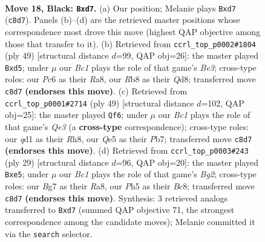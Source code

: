 \documentclass[11pt]{article}
\begin{document}
\clearpage

\begin{figure}[p]\centering
\begin{subfigure}{0.46\textwidth}\centering
\resizebox{\linewidth}{!}{%
\newchessgame
\chessboard[
  setfen={1rb2rk1/p2B1pb1/2pp4/4q2p/P1PNp2P/6P1/8/R1BQK2R b KQ - 0 18},
  showmover=false,
  pgfstyle=straightmove, color=movearrow, markmove={c8-d7}
]}
\caption{}
\end{subfigure}\hfill
\begin{subfigure}{0.46\textwidth}\centering
\resizebox{\linewidth}{!}{%
\newchessgame
\chessboard[
  setfen={r2qr2k/6p1/3pbp2/P2N2bp/3QPp2/8/6PP/R3BRK1 b - - 2 25},
  showmover=false,
  pgfstyle=straightmove, color=movearrow, markmove={e6-d5}
]}
\caption{}
\end{subfigure}
\\[4pt]
\begin{subfigure}{0.46\textwidth}\centering
\resizebox{\linewidth}{!}{%
\newchessgame
\chessboard[
  setfen={1k1r3r/pp2np2/3bq3/PPNp2pp/8/4P1P1/2Q1BPP1/1R2K2R b K - 5 25},
  showmover=false,
  pgfstyle=straightmove, color=movearrow, markmove={e6-f6}
]}
\caption{}
\end{subfigure}\hfill
\begin{subfigure}{0.46\textwidth}\centering
\resizebox{\linewidth}{!}{%
\newchessgame
\chessboard[
  setfen={r1bq1rk1/pp3pb1/6p1/2pNN2p/4P2P/8/PPQ1BPP1/R3K2R b KQ - 0 15},
  showmover=false,
  pgfstyle=straightmove, color=movearrow, markmove={g7-e5}
]}
\caption{}
\end{subfigure}
\caption{\textbf{Move 18, Black: \texttt{Bxd7}.} (a) Our position; Melanie plays \texttt{Bxd7} (\texttt{c8d7}). Panels (b)--(d) are the retrieved master positions whose correspondence most drove this move (highest QAP objective among those that transfer to it). (b) Retrieved from \texttt{ccrl\_top\_p0002\#1804} (ply 49) [structural distance $d$=99, QAP obj=26]: the master played \texttt{Bxd5}; under $\mu$ our \emph{Bc1} plays the role of that game's \emph{Be3}; cross-type roles: our \emph{P}c6 as their \emph{R}a8, our \emph{R}b8 as their \emph{Q}d8; transferred move \texttt{c8d7} \textbf{(endorses this move)}. (c) Retrieved from \texttt{ccrl\_top\_p0001\#2714} (ply 49) [structural distance $d$=102, QAP obj=25]: the master played \texttt{Qf6}; under $\mu$ our \emph{Bc1} plays the role of that game's \emph{Qe3} (a \textbf{cross-type} correspondence); cross-type roles: our \emph{q}d1 as their \emph{R}h8, our \emph{Q}e5 as their \emph{P}b7; transferred move \texttt{c8d7} \textbf{(endorses this move)}. (d) Retrieved from \texttt{ccrl\_top\_p0003\#243} (ply 29) [structural distance $d$=96, QAP obj=20]: the master played \texttt{Bxe5}; under $\mu$ our \emph{Bc1} plays the role of that game's \emph{Bg2}; cross-type roles: our \emph{B}g7 as their \emph{R}a8, our \emph{P}h5 as their \emph{B}c8; transferred move \texttt{c8d7} \textbf{(endorses this move)}. Synthesis: 3 retrieved analogs transferred to \texttt{Bxd7} (summed QAP objective 71, the strongest correspondence among the candidate moves); Melanie committed it via the \texttt{search} selector.}
\label{fig:thought-m35}
\end{figure}
\end{document}

